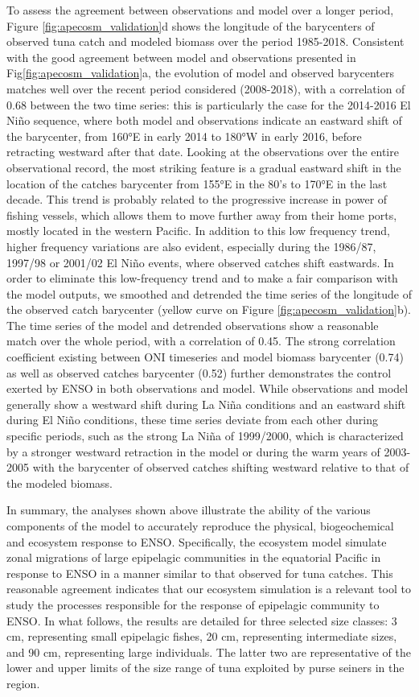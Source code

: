 To assess the agreement between observations and model over a longer period, Figure \ref{fig:apecosm_validation}d shows the longitude of the barycenters of observed tuna catch and modeled biomass over the period 1985-2018. Consistent with the good agreement between model and observations presented in Fig\ref{fig:apecosm_validation}a, the evolution of model and observed barycenters matches well over the recent period considered (2008-2018), with a correlation of 0.68 between the two time series: this is particularly the case for the 2014-2016 El Niño sequence, where both model and observations indicate an eastward shift of the barycenter, from 160°E in early 2014 to 180°W in early 2016, before retracting westward after that date. Looking at the observations over the entire observational record, the most striking feature is a gradual eastward shift in the location of the catches barycenter from 155°E in the 80's to 170°E in the last decade. This trend is probably related to the progressive increase in power of fishing vessels, which allows them to move further away from their home ports, mostly located in the western Pacific. In addition to this low frequency trend, higher frequency variations are also evident, especially during the 1986/87, 1997/98 or 2001/02 El Niño events, where observed catches shift eastwards. In order to eliminate this low-frequency trend and to make a fair comparison with the model outputs, we smoothed and detrended the time series of the longitude of the observed catch barycenter (yellow curve on Figure \ref{fig:apecosm_validation}b). The time series of the model and detrended observations show a reasonable match over the whole period, with a correlation of 0.45. The strong correlation coefficient existing between ONI timeseries and model biomass barycenter (0.74) as well as observed catches barycenter (0.52) further demonstrates the control exerted by ENSO in both observations and model. While observations and model generally show a westward shift during La Niña conditions and an eastward shift during El Niño conditions, these time series deviate from each other during specific periods, such as the strong La Niña of 1999/2000, which is characterized by a stronger westward retraction in the model or during the warm years of 2003-2005 with the barycenter of observed catches shifting westward relative to that of the modeled biomass.

In summary, the analyses shown above illustrate the ability of the various components of the model to accurately reproduce the physical, biogeochemical and ecosystem response to ENSO. Specifically, the ecosystem model simulate zonal migrations of large epipelagic communities in the equatorial Pacific in response to ENSO in a manner similar to that observed for tuna catches. This reasonable agreement indicates that our ecosystem simulation is a relevant tool to study the processes responsible for the response of epipelagic community to ENSO. In what follows, the results are detailed for three selected size classes: 3 cm, representing small epipelagic fishes, 20 cm, representing intermediate sizes, and 90 cm, representing large individuals. The latter two are representative of the lower and upper limits of the size range of tuna exploited by purse seiners in the region.

\clearpage